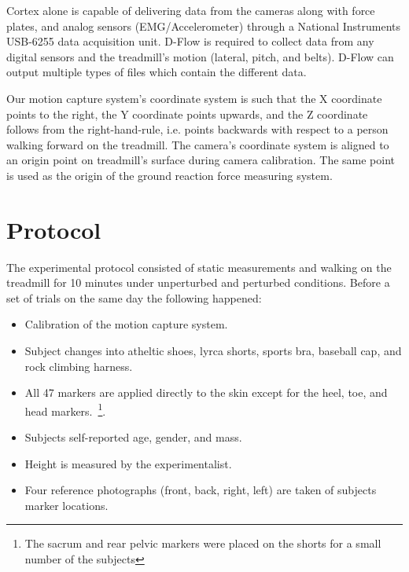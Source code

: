 \documentclass[10pt,a4paper,twocolumn]{article}
\begin{document}
Cortex alone is capable of delivering data from the cameras along with force
plates, and analog sensors (EMG/Accelerometer) through a National Instruments
USB-6255 data acquisition unit. D-Flow is required to collect data from any
digital sensors and the treadmill's motion (lateral, pitch, and belts). D-Flow
can output multiple types of files which contain the different data.

Our motion capture system's coordinate system is such that the X coordinate
points to the right, the Y coordinate points upwards, and the Z coordinate
follows from the right-hand-rule, i.e. points backwards with respect to a
person walking forward on the treadmill. The camera's coordinate system is
aligned to an origin point on treadmill's surface during camera calibration.
The same point is used as the origin of the ground reaction force measuring
system.

\section*{Protocol}
%
The experimental protocol consisted of static measurements and walking on the
treadmill for 10 minutes under unperturbed and perturbed conditions. Before a
set of trials on the same day the following happened:
%
\begin{itemize}
  \item Calibration of the motion capture system.
  \item Subject changes into atheltic shoes, lyrca shorts, sports bra, baseball
    cap, and rock climbing harness.
  \item All 47 markers are applied directly to the skin except for the heel,
    toe, and head markers.~\footnote{The sacrum and rear pelvic markers were
    placed on the shorts for a small number of the subjects}.
  \item Subjects self-reported age, gender, and mass.
  \item Height is measured by the experimentalist.
  \item Four reference photographs (front, back, right, left) are taken of
    subjects marker locations.
\end{itemize}
\end{document}
